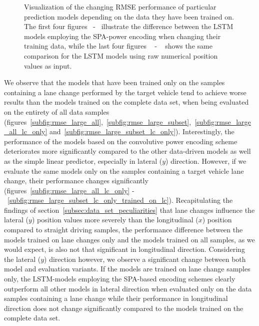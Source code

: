 \begin{figure}[th!]
{    }
    \caption{Visualization of the changing \ac{RMSE} performance of particular prediction models depending on the data they have been trained on.
        The first four figures~\protect{} -~\protect{} illustrate the difference between the \ac{LSTM} models employing the \ac{SPA}-power encoding when changing their training data, while the last four figures ~\protect{} -
        ~\protect{} shows the same comparison for the \ac{LSTM} models using raw numerical position values as input.
    }
    \label{fig:rmse_on_board_training_all_vs_training_on_lc_only}
\end{figure}

We observe that the models that have been trained only on the samples containing a lane change performed by the target vehicle tend to achieve worse results than the models trained on the complete data set, when being evaluated on the entirety of all data samples (figures~\ref{subfig:rmse_large_all},~\ref{subfig:rmse_large_subset},~\ref{subfig:rmse_large_all_lc_only} and~\ref{subfig:rmse_large_subset_lc_only}).
Interestingly, the performance of the models based on the convolutive power encoding scheme deteriorates more significantly compared to the other data-driven models as well as the simple linear predictor, especially in lateral ($y$) direction.
However, if we evaluate the same models only on the samples containing a target vehicle lane change, their performance changes significantly (figures~\ref{subfig:rmse_large_all_lc_only} -~\ref{subfig:rmse_large_subset_lc_only_trained_on_lc}).
Recapitulating the findings of section~\ref{subsec:data_set_peculiarities} that lane changes influence the lateral ($y$) position values more severely than the longitudinal ($x$) position compared to straight driving samples, the performance difference between the models trained on lane changes only and the models trained on all samples, as we would expect, is also not that significant in longitudinal direction.
Considering the lateral ($y$) direction however, we observe a significant change between both model and evaluation variants.
If the models are trained on lane change samples only, the \ac{LSTM}-models employing the \ac{SPA}-based encoding schemes clearly outperform all other models in lateral direction when evaluated only on the data samples containing a lane change while their performance in longitudinal direction does not change significantly compared to the models trained on the complete data set.

